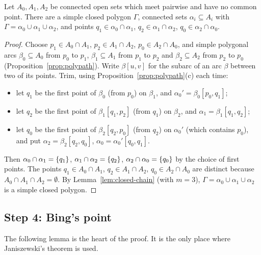 \begin{lemma}\label{lem:theta-polygon}
Let $A_0,A_1,A_2$ be connected open sets which meet pairwise and have no common point. There are a
simple closed polygon $\Gamma$, connected sets $\alpha_i\subseteq A_i$ with
$\Gamma=\alpha_0\cup\alpha_1\cup\alpha_2$, and points $q_1\in\alpha_0\cap\alpha_1$,
$q_2\in\alpha_1\cap\alpha_2$, $q_0\in\alpha_2\cap\alpha_0$.
\end{lemma}

\begin{proof}
Choose $p_1\in A_0\cap A_1$, $p_2\in A_1\cap A_2$, $p_0\in A_2\cap A_0$, and simple polygonal arcs
$\beta_0\subseteq A_0$ from $p_0$ to $p_1$, $\beta_1\subseteq A_1$ from $p_1$ to $p_2$ and
$\beta_2\subseteq A_2$ from $p_2$ to $p_0$ (Proposition~\ref{prop:polypath}). Write $\beta[u,v]$ for the
subarc of an arc $\beta$ between two of its points. Trim, using
Proposition~\ref{prop:polypath}(c) each time:
\begin{itemize}
\item let $q_1$ be the first point of $\beta_0$ (from $p_0$) on $\beta_1$, and $\alpha_0'=\beta_0[p_0,q_1]$;
\item let $q_2$ be the first point of $\beta_1[q_1,p_2]$ (from $q_1$) on $\beta_2$, and
$\alpha_1=\beta_1[q_1,q_2]$;
\item let $q_0$ be the first point of $\beta_2[q_2,p_0]$ (from $q_2$) on $\alpha_0'$ (which contains
$p_0$), and put $\alpha_2=\beta_2[q_2,q_0]$, $\alpha_0=\alpha_0'[q_0,q_1]$.
\end{itemize}
Then $\alpha_0\cap\alpha_1=\left\{ q_1 \right\}$, $\alpha_1\cap\alpha_2=\left\{ q_2 \right\}$, $\alpha_2\cap\alpha_0=\left\{ q_0 \right\}$ by
the choice of first points. The points $q_1\in A_0\cap A_1$, $q_2\in A_1\cap A_2$, $q_0\in A_2\cap A_0$
are distinct because $A_0\cap A_1\cap A_2=\emptyset$. By Lemma~\ref{lem:closed-chain} (with $m=3$),
$\Gamma=\alpha_0\cup\alpha_1\cup\alpha_2$ is a simple closed polygon.
\end{proof}


\subsection*{Step 4: Bing's point}

The following lemma is the heart of the proof. It is the only place where Janiszewski's theorem is
used.

